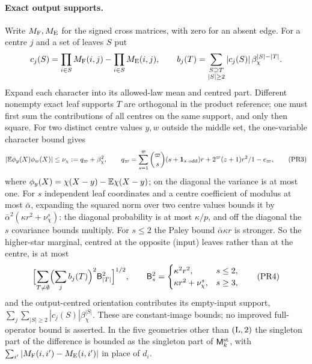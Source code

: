\paragraph{Exact output supports.}
Write $M_{\rm F},M_{\rm E}$ for the signed cross matrices, with zero for an absent edge.
For a centre $j$ and a set of leaves $S$ put
\[
 c_j(S)=\prod_{i\in S}M_{\rm F}(i,j)-\prod_{i\in S}M_{\rm E}(i,j),\qquad
 b_j(T)=\sum_{\substack{S\supseteq T\\|S|\ge2}}|c_j(S)|\,\beta_\chi^{|S|-|T|}.
\]
Expand each character into its allowed-law mean and centred part. Different nonempty
exact leaf supports $T$ are orthogonal in the product reference; one must first sum the
contributions of all centres on the same support, and only then square. For two
distinct centre values $y,w$ outside the middle set, the one-variable character bound
gives
\[
 |\mathbb E\phi_y(X)\phi_w(X)|\le\nu_\chi:=q_\varpi+\beta_\chi^2,\qquad
 q_\varpi=\sum_{s=1}^\varpi\binom{\varpi}{s}(s+\mathbf 1_{s\ \rm odd})r
 +2^\varpi(z+1)r^2/1-e_\varpi,
 \tag{PR3}
\]
where $\phi_y(X)=\chi(X-y)-\mathbb E\chi(X-y)$; on the diagonal the variance is at most one.
For $s$ independent leaf coordinates and a centre coefficient of modulus at most
$\bar\alpha$, expanding the squared norm over two centre values bounds it by
$\bar\alpha^2(\kappa r^2+\nu_\chi^s)$: the diagonal probability is at most $\kappa/p$,
and off the diagonal the $s$ covariance bounds multiply. For
$s\le2$ the Paley bound $\bar\alpha\kappa r$ is stronger. So
the higher-star marginal, centred at the opposite (input) leaves
rather than at the centre, is at most
\[
 \Bigl[\sum_{T\ne\emptyset}\Bigl(\sum_jb_j(T)\Bigr)^2\mathsf B_{|T|}^2\Bigr]^{1/2},\qquad
 \mathsf B_s^2=\begin{cases}\kappa^2r^2,&s\le2,\\ \kappa r^2+\nu_\chi^s,&s\ge3,\end{cases}
 \tag{PR4}
\]
and the output-centred orientation contributes its empty-input support,
$\sum_j\sum_{|S|\ge2}|c_j(S)|\beta_\chi^{|S|}$. These are constant-image bounds; no
improved full-operator bound is asserted. In the five geometries other than
$({\rm L},2)$ the singleton part of the difference is bounded as the singleton part of
$\mathsf M^{\rm st}_k$, with $\sum_{i'}|M_{\rm F}(i,i')-M_{\rm E}(i,i')|$ in place of
$d_i$.

